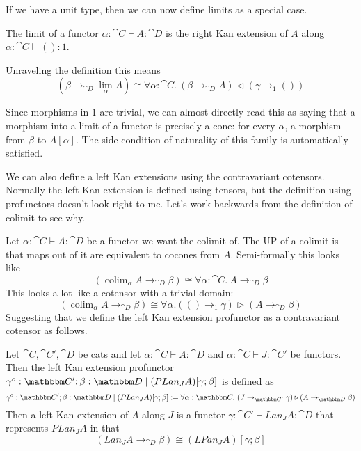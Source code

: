 \documentclass{article}
\DeclareMathOperator*{\colim}{colim}
\begin{document}
If we have a unit type, then we can now define limits as a special
case.
\begin{definition}
  The limit of a functor $\alpha : \cat C \vdash A : \cat D$ is the
  right Kan extension of $A$ along $\alpha : \cat C \vdash () : 1$.

  Unraveling the definition this means
  \[ (\beta \to_{\cat D} \lim_\alpha A) \cong \forall \alpha:\cat C.~ (\beta \to_{\cat D} A) \triangleleft (\gamma \to_{1} ()) \]
\end{definition}
Since morphisms in $1$ are trivial, we can almost directly read this
as saying that a morphism into a limit of a functor is precisely a
cone: for every $\alpha$, a morphism from $\beta$ to $A[\alpha]$. The
side condition of naturality of this family is automatically
satisfied.

We can also define a left Kan extensions using the contravariant
cotensors.  Normally the left Kan extension is defined using tensors,
but the definition using profunctors doesn't look right to me. Let's
work backwards from the definition of colimit to see why.

Let $\alpha : \cat C \vdash A : \cat D$ be a functor we want the
colimit of. The UP of a colimit is that maps out of it are equivalent
to cocones from $A$. Semi-formally this looks like
\[ (\colim_{\alpha} A \to_{\cat D} \beta) \cong \forall \alpha:\cat C.~ A \to_{\cat D} \beta \]
This looks a lot like a cotensor with a trivial domain:
\[ (\colim_{\alpha} A \to_{\cat D} \beta) \cong \forall \alpha. (() \to_{1} \gamma) \triangleright (A \to_{\cat D} \beta) \]
Suggesting that we define the left Kan extension profunctor as a
contravariant cotensor as follows.
\begin{definition}
  Let $\cat C,\cat C',\cat D$ be cats and let $\alpha:\cat C \vdash A
  : \cat D$ and $\alpha : \cat C \vdash J : \cat C'$ be functors.
  Then the left Kan extension profunctor $\gamma^o:\cat C'; \beta:\cat
  D \pipe (PLan_J A)[\gamma;\beta]$ is defined as
  \[
  \gamma^o:\cat C'; \beta:\cat D \pipe (PLan_J A)[\gamma;\beta]
  := \forall \alpha : \cat C.~ (J \to_{\cat C'} \gamma) \triangleright (A \to_{\cat D} \beta)
  \]
  Then a left Kan extension of $A$ along $J$ is a functor $\gamma :
  \cat C' \vdash Lan_J A : \cat D$ that represents $PLan_J A$ in that
  \[ (Lan_J A \to_{\cat D} \beta) \cong (LPan_J A)[\gamma;\beta] \]
\end{definition}


\end{document}
